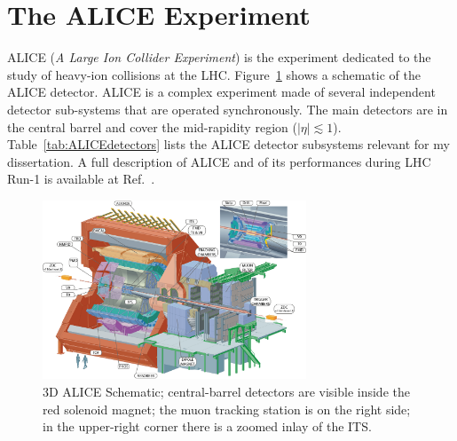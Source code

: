 \documentclass[12pt, a4paper, twoside, titlepage]{article}
\begin{document}
\section{The ALICE Experiment}
ALICE (\emph{A Large Ion Collider Experiment}) is the experiment dedicated to the study of heavy-ion collisions at the LHC.
Figure~\ref{fig:alice} shows a schematic of the ALICE detector.
ALICE is a complex experiment made of several independent detector sub-systems that are operated synchronously.
The main detectors are in the central barrel and cover the mid-rapidity region ($\lvert \eta\rvert \lesssim 1$).
Table~\ref{tab:ALICEdetectors} lists the ALICE detector subsystems
relevant for my dissertation.
A full description of ALICE and of its performances during LHC Run-1 is available at Ref.~\cite{ALICE:2014b}.\

\begin{figure}[tb]
\begin{center}
\includegraphics[width=0.7\textwidth]{img/alice}
 \caption{3D ALICE Schematic; central-barrel detectors are visible inside the red solenoid magnet;
 the muon tracking station is on the right side; in the upper-right corner there is a zoomed inlay of the ITS.} 
 \label{fig:alice}
\end{center}
\end{figure}
\end{document}
